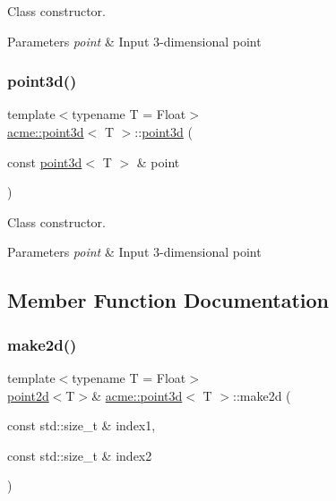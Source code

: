 Class constructor. 


\begin{DoxyParams}{Parameters}
{\em point} & Input 3-\/dimensional point \\
\hline
\end{DoxyParams}
\mbox{\label{classacme_1_1point3d_abd49fc12054b5a19c13973f9d0abcf3d}} 
\subsubsection{\texorpdfstring{point3d()}{point3d()}\hspace{0.1cm}{\footnotesize\ttfamily [3/3]}}
{\footnotesize\ttfamily template$<$typename T = Float$>$ \\
\hyperlink{classacme_1_1point3d}{acme\+::point3d}$<$ T $>$\+::\hyperlink{classacme_1_1point3d}{point3d} (\begin{DoxyParamCaption}\item[{const \hyperlink{classacme_1_1point3d}{point3d}$<$ T $>$ \&}]{point }\end{DoxyParamCaption})\hspace{0.3cm}{\ttfamily [inline]}}



Class constructor. 


\begin{DoxyParams}{Parameters}
{\em point} & Input 3-\/dimensional point \\
\hline
\end{DoxyParams}


\subsection{Member Function Documentation}
\mbox{\label{classacme_1_1point3d_a724a96c6ad4aa84b0236a8113d99d4a4}} 
\subsubsection{\texorpdfstring{make2d()}{make2d()}}
{\footnotesize\ttfamily template$<$typename T = Float$>$ \\
\hyperlink{classacme_1_1point2d}{point2d}$<$T$>$\& \hyperlink{classacme_1_1point3d}{acme\+::point3d}$<$ T $>$\+::make2d (\begin{DoxyParamCaption}\item[{const std\+::size\+\_\+t \&}]{index1,  }\item[{const std\+::size\+\_\+t \&}]{index2 }\end{DoxyParamCaption})\hspace{0.3cm}{\ttfamily [inline]}}



